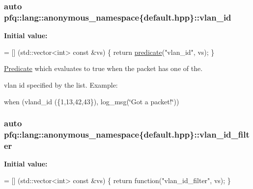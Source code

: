\subsubsection[{\texorpdfstring{vlan\+\_\+id}{vlan_id}}]{\setlength{\rightskip}{0pt plus 5cm}auto pfq\+::lang\+::anonymous\+\_\+namespace\{default.\+hpp\}\+::vlan\+\_\+id}\hypertarget{namespacepfq_1_1lang_1_1anonymous__namespace_02default_8hpp_03_ad2a631020f34bf10335ebb0e79f03920}{}\label{namespacepfq_1_1lang_1_1anonymous__namespace_02default_8hpp_03_ad2a631020f34bf10335ebb0e79f03920}
{\bfseries Initial value\+:}
\begin{DoxyCode}
= [] (std::vector<int> \textcolor{keyword}{const} &vs) \{
                                    \textcolor{keywordflow}{return} \hyperlink{namespacepfq_1_1lang_aca9adafc436b7f851621b979fa1aaf88}{predicate}(\textcolor{stringliteral}{"vlan\_id"}, vs);
                                \}
\end{DoxyCode}


\hyperlink{structpfq_1_1lang_1_1Predicate}{Predicate} which evaluates to {\ttfamily true} when the packet has one of the. 

vlan id specified by the list. Example\+:

when (vland\+\_\+id (\{1,13,42,43\}), log\+\_\+msg(\char`\"{}\+Got a packet!\char`\"{})) 
\subsubsection[{\texorpdfstring{vlan\+\_\+id\+\_\+filter}{vlan_id_filter}}]{\setlength{\rightskip}{0pt plus 5cm}auto pfq\+::lang\+::anonymous\+\_\+namespace\{default.\+hpp\}\+::vlan\+\_\+id\+\_\+filter}\hypertarget{namespacepfq_1_1lang_1_1anonymous__namespace_02default_8hpp_03_ab843ad210e98a7c8a4218efaf60f8c01}{}\label{namespacepfq_1_1lang_1_1anonymous__namespace_02default_8hpp_03_ab843ad210e98a7c8a4218efaf60f8c01}
{\bfseries Initial value\+:}
\begin{DoxyCode}
= [] (std::vector<int> \textcolor{keyword}{const} &vs) \{
                                    \textcolor{keywordflow}{return} \textcolor{keyword}{function}(\textcolor{stringliteral}{"vlan\_id\_filter"}, vs);
                              \}
\end{DoxyCode}


